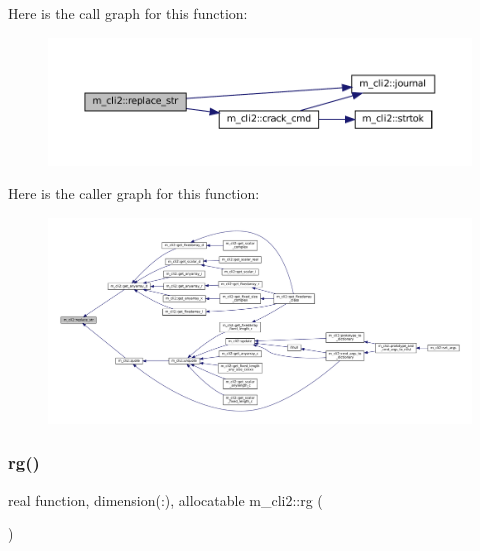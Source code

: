 Here is the call graph for this function\+:
\nopagebreak
\begin{figure}[H]
\begin{center}
\leavevmode
\includegraphics[width=350pt]{namespacem__cli2_a8f65cf1b227d837d89437368c660666f_cgraph}
\end{center}
\end{figure}
Here is the caller graph for this function\+:
\nopagebreak
\begin{figure}[H]
\begin{center}
\leavevmode
\includegraphics[width=350pt]{namespacem__cli2_a8f65cf1b227d837d89437368c660666f_icgraph}
\end{center}
\end{figure}
\mbox{\label{namespacem__cli2_aff7a379ff1e7269001592f452ab017c8}} 
\subsubsection{\texorpdfstring{rg()}{rg()}}
{\footnotesize\ttfamily real function, dimension(\+:), allocatable m\+\_\+cli2\+::rg (\begin{DoxyParamCaption}{ }\end{DoxyParamCaption})\hspace{0.3cm}{\ttfamily [private]}}

\mbox{\label{namespacem__cli2_ade3a531cb1b2a60855ebe38031f7ed7a}} 
